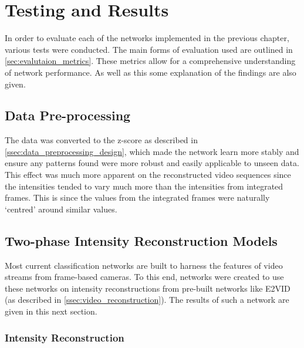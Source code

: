\chapter{Testing and Results} \label{chap:testing_and_results}

In order to evaluate each of the networks implemented in the previous chapter, various tests were conducted. The main forms of evaluation used are outlined in \cref{sec:evalutaion_metrics}. These metrics allow for a comprehensive understanding of network performance. As well as this some explanation of the findings are also given.

\section{Data Pre-processing}

The data was converted to the z-score as described in \cref{ssec:data_preprocessing_design}, which made the network learn more stably and ensure any patterns found were more robust and easily applicable to unseen data. This effect was much more apparent on the reconstructed video sequences since the intensities tended to vary much more than the intensities from integrated frames. This is since the values from the integrated frames were naturally `centred' around similar values.

\section{Two-phase Intensity Reconstruction Models}

Most current classification networks are built to harness the features of video streams from frame-based cameras. To this end, networks were created to use these networks on intensity reconstructions from pre-built networks like E2VID (as described in \cref{ssec:video_reconstruction}). The results of such a network are given in this next section.

\subsection{Intensity Reconstruction}

